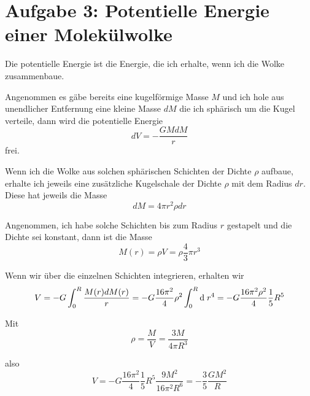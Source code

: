 \documentclass[a4paper,german,12pt,smallheadings]{scrartcl}
\begin{document}
\section*{Aufgabe 3: Potentielle Energie einer Molekülwolke}
Die potentielle Energie ist die Energie, die ich erhalte, wenn ich die Wolke
zusammenbaue.

Angenommen es gäbe bereits eine kugelförmige Masse $M$ und ich hole aus
unendlicher Entfernung eine kleine Masse $dM$ die ich sphärisch um die Kugel
verteile, dann wird die potentielle Energie
\begin{equation}
  dV = - \frac{G M dM}{r}
\end{equation}
frei.

Wenn ich die Wolke aus solchen sphärischen Schichten der Dichte $\rho$ aufbaue,
erhalte ich jeweils eine zusätzliche Kugelschale der Dichte $\rho$ mit dem
Radius $dr$. Diese hat jeweils die Masse
\begin{equation}
  dM = 4 \pi r^2 \rho dr
\end{equation}

Angenommen, ich habe solche Schichten bis zum Radius $r$ gestapelt und die
Dichte sei konstant, dann ist die Masse
\begin{equation}
  M(r) = \rho V = \rho \frac{4}{3} \pi r^3
\end{equation}

Wenn wir über die einzelnen Schichten integrieren, erhalten wir
\begin{equation}
  V = -G \int_0^R \frac{M(r) dM(r)}{r} = -G \frac{16 \pi^2}{4} \rho^2 \int_0^R \dif \; r^4 = -G\frac{16 \pi^2 \rho^2}{4} \frac{1}{5} R^5
\end{equation}

Mit
\begin{equation}
  \rho = \frac{M}{V} = \frac{3 M}{4 \pi R^3}
\end{equation}

also
\begin{equation}
  V = -G \frac{16 \pi^2}{4} \frac{1}{5} R^5 \frac{9 M^2}{16\pi^2 R^6} = - \frac{3}{5} \frac{G M^2}{R}
\end{equation}
\end{document}
